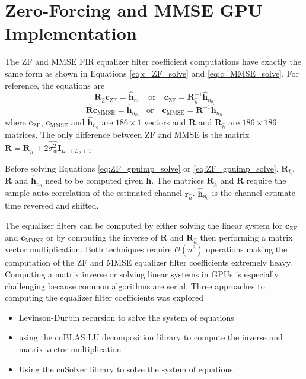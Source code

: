 \clearpage
\section{Zero-Forcing and MMSE GPU Implementation}
The ZF and MMSE FIR equalizer filter coefficient computations have exactly the same form as shown in Equations \eqref{eq:c_ZF_solve} and \eqref{eq:c_MMSE_solve}. For reference, the equations are 
\begin{equation}
\mathbf{R}_{\hat{h}} \mathbf{c}_\text{ZF} = \hat{\mathbf{h}}_{n_0} \quad \text{or} \quad \mathbf{c}_\text{ZF} = \mathbf{R}_{\hat{h}}^{-1}\hat{\mathbf{h}}_{n_0}
\label{eq:ZF_gpuimp_solve}
\end{equation}
\begin{equation}
\mathbf{R} \mathbf{c}_\text{MMSE} = \hat{\mathbf{h}}_{n_0} \quad \text{or} \quad \mathbf{c}_\text{MMSE} = \mathbf{R}^{-1} \hat{\mathbf{h}}_{n_0}
\label{eq:MMSE_gpuimp_solve}
\end{equation}
where $\mathbf{c}_\text{ZF}$, $\mathbf{c}_\text{MMSE}$ and $\hat{\mathbf{h}}_{n_0}$ are $186\times1$ vectors and  $\mathbf{R}$ and $\mathbf{R}_{\hat{h}}$ are $186\times186$ matrices.
The only difference between ZF and MMSE is the matrix $\mathbf{R} = 
\mathbf{R}_{\hat{h}} + 2\hat{\sigma^2_w} \mathbf{I}_{L_1+L_2+1}$.

Before solving Equations \eqref{eq:ZF_gpuimp_solve} or \eqref{eq:ZF_gpuimp_solve}, $\mathbf{R}_{\hat{h}}$, $\mathbf{R}$ and $\hat{\mathbf{h}}_{n_0}$ need to be computed given $\hat{\mathbf{h}}$.
The matrices $\mathbf{R}_{\hat{h}}$ and $\mathbf{R}$ require the sample auto-correlation of the estimated channel $\mathbf{r}_{\hat{h}}$.
$\hat{\mathbf{h}}_{n_0}$ is the channel estimate time reversed and shifted.

The equalizer filters can be computed by either solving the linear system for $\mathbf{c}_\text{ZF}$ and $\mathbf{c}_\text{MMSE}$ or by computing the inverse of $\mathbf{R}$ and $\mathbf{R}_{\hat{h}}$ then performing a matrix vector multiplication.
Both techniques require $\mathcal{O}(n^3)$ operations making the computation of the ZF and MMSE equalizer filter coefficients extremely heavy.
Computing a matrix inverse or solving linear systems in GPUs is especially challenging because common algorithms are serial.
Three approaches to computing the equalizer filter coefficients was explored
\begin{itemize}
\item Levinson-Durbin recursion to solve the system of equations
\item using the cuBLAS LU decomposition library to compute the inverse and matrix vector multiplication
\item Using the cuSolver library to solve the system of equations.
\end{itemize}

